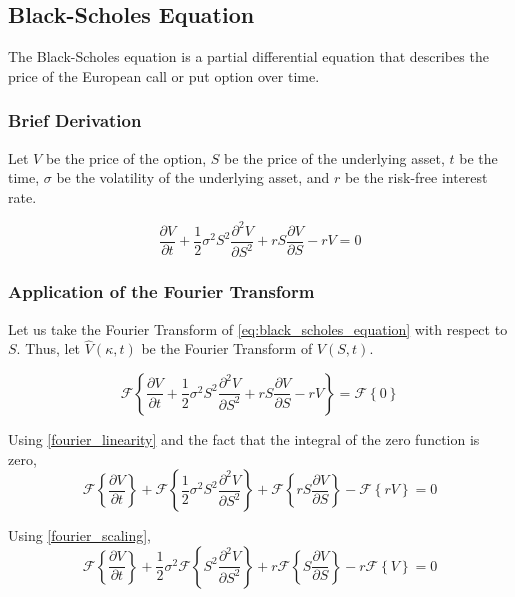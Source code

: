 \subsection{Black-Scholes Equation}
The Black-Scholes equation is a partial differential equation that describes the price of the European call or put option over time.

\subsubsection{Brief Derivation}
Let \(V\) be the price of the option, \(S\) be the price of the underlying asset, \(t\) be the time, \(\sigma\) be the volatility of the underlying asset, and \(r\) be the risk-free interest rate.

\begin{equation} \label{eq:black_scholes_equation}
    \frac{\partial V}{\partial t} + \frac{1}{2}\sigma^2 S^2 \frac{\partial^2 V}{\partial S^2} + rS\frac{\partial V}{\partial S} - rV = 0
\end{equation}

\subsubsection{Application of the Fourier Transform}
Let us take the Fourier Transform of \cref{eq:black_scholes_equation} with respect to \(S\). Thus, let \(\hat{V}(\kappa, t)\) be the Fourier Transform of \(V(S, t)\).

\begin{equation}
    \mathcal{F} \left\{ \frac{\partial V}{\partial t} + \frac{1}{2}\sigma^2 S^2 \frac{\partial^2 V}{\partial S^2} + rS\frac{\partial V}{\partial S} -  rV \right\} = \mathcal{F} \left\{ 0 \right\}
\end{equation}

\noindent
Using \cref{fourier_linearity} and the fact that the integral of the zero function is zero,
\begin{equation}
    \mathcal{F} \left\{ \frac{\partial V}{\partial t} \right\} + \mathcal{F} \left\{ \frac{1}{2}\sigma^2 S^2 \frac{\partial^2 V}{\partial S^2} \right\} + \mathcal{F} \left\{ rS\frac{\partial V}{\partial S} \right\} - \mathcal{F} \left\{ rV \right\} = 0
\end{equation}

\noindent
Using \cref{fourier_scaling},
\begin{equation} 
    \mathcal{F} \left\{ \frac{\partial V}{\partial t} \right\} + \frac{1}{2}\sigma^2 \mathcal{F} \left\{ S^2 \frac{\partial^2 V}{\partial S^2} \right\} + r \mathcal{F} \left\{ S\frac{\partial V}{\partial S} \right\} - r \mathcal{F} \left\{ V \right\} = 0
\end{equation}

